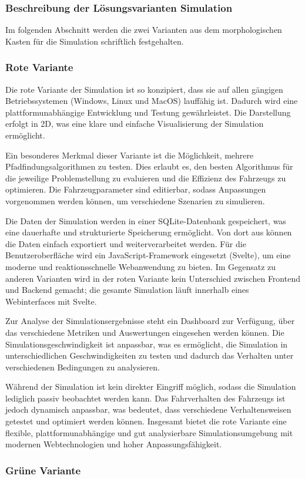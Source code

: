 \documentclass[main.tex]{subfiles} %
\begin{document}

\subsubsection{Beschreibung der Lösungsvarianten Simulation}
Im folgenden Abschnitt werden die zwei Varianten aus dem morphologischen Kasten für die Simulation
schriftlich festgehalten.

\subsubsection*{Rote Variante}
Die rote Variante der Simulation ist so konzipiert, dass sie auf allen gängigen Betriebssystemen (Windows, Linux und MacOS) lauffähig ist. Dadurch wird eine plattformunabhängige Entwicklung und Testung gewährleistet. Die Darstellung erfolgt in 2D, was eine klare und einfache Visualisierung der Simulation ermöglicht.

Ein besonderes Merkmal dieser Variante ist die Möglichkeit, mehrere Pfadfindungsalgorithmen zu testen. Dies erlaubt es, den besten Algorithmus für die jeweilige Problemstellung zu evaluieren und die Effizienz des Fahrzeugs zu optimieren. Die Fahrzeugparameter sind editierbar, sodass Anpassungen vorgenommen werden können, um verschiedene Szenarien zu simulieren.

Die Daten der Simulation werden in einer SQLite-Datenbank gespeichert, was eine dauerhafte und strukturierte Speicherung ermöglicht. Von dort aus können die Daten einfach exportiert und weiterverarbeitet werden. Für die Benutzeroberfläche wird ein JavaScript-Framework eingesetzt (Svelte), um eine moderne und reaktionsschnelle Webanwendung zu bieten. Im Gegensatz zu anderen Varianten wird in der roten Variante kein Unterschied zwischen Frontend und Backend gemacht; die gesamte Simulation läuft innerhalb eines Webinterfaces mit Svelte.

Zur Analyse der Simulationsergebnisse steht ein Dashboard zur Verfügung, über das verschiedene Metriken und Auswertungen eingesehen werden können. Die Simulationsgeschwindigkeit ist anpassbar, was es ermöglicht, die Simulation in unterschiedlichen Geschwindigkeiten zu testen und dadurch das Verhalten unter verschiedenen Bedingungen zu analysieren.

Während der Simulation ist kein direkter Eingriff möglich, sodass die Simulation lediglich passiv beobachtet werden kann. Das Fahrverhalten des Fahrzeugs ist jedoch dynamisch anpassbar, was bedeutet, dass verschiedene Verhaltensweisen getestet und optimiert werden können. Insgesamt bietet die rote Variante eine flexible, plattformunabhängige und gut analysierbare Simulationsumgebung mit modernen Webtechnologien und hoher Anpassungsfähigkeit.

\subsubsection*{Grüne Variante}
\lipsum[4]
\end{document}
